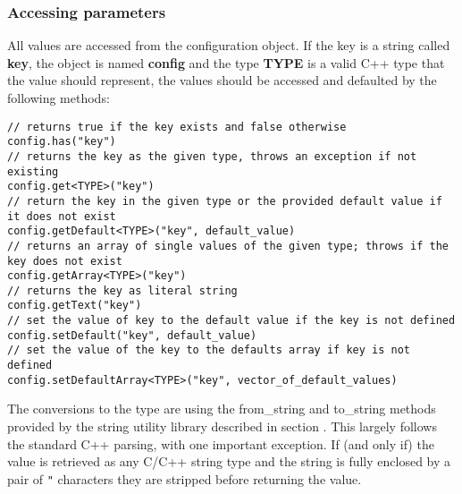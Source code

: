 \subsubsection{Accessing parameters}
All values are accessed from the configuration object. If the key is a string called \textbf{key}, the object is named \textbf{config} and the type \textbf{TYPE} is a valid C++ type that the value should represent, the values should be accessed and defaulted by the following methods:
\begin{verbatim}
// returns true if the key exists and false otherwise
config.has("key") 
// returns the key as the given type, throws an exception if not existing
config.get<TYPE>("key") 
// return the key in the given type or the provided default value if it does not exist
config.getDefault<TYPE>("key", default_value) 
// returns an array of single values of the given type; throws if the key does not exist
config.getArray<TYPE>("key")
// returns the key as literal string
config.getText("key") 
// set the value of key to the default value if the key is not defined
config.setDefault("key", default_value) 
// set the value of the key to the defaults array if key is not defined
config.setDefaultArray<TYPE>("key", vector_of_default_values)
\end{verbatim}

The conversions to the type are using the from\_string and to\_string methods provided by the string utility library described in section \needref. This largely follows the standard C++ parsing, with one important exception. If (and only if) the value is retrieved as any C/C++ string type and the string is fully enclosed by a pair of \texttt{"} characters they are stripped before returning the value. 

